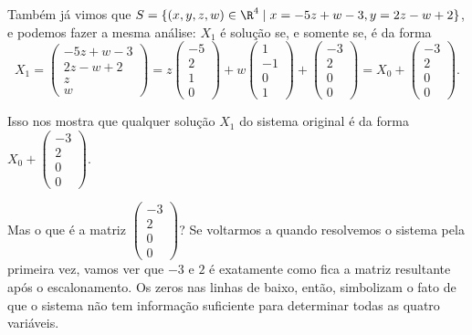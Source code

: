\begin{ex}
	Também já vimos que $S=\{(x,y,z,w)\in \R^4\mid x=-5z+w-3,y=2z-w+2\}$, e podemos fazer a mesma análise: $X_1$ é solução se, e somente se, é da forma
	\[X_1=\begin{pmatrix}
	-5z+w-3\\2z-w+2\\z\\w
	\end{pmatrix}=z\begin{pmatrix}
	-5\\2\\1\\0
	\end{pmatrix}+w\begin{pmatrix}
	1\\-1\\0\\1
	\end{pmatrix}+\begin{pmatrix}
	-3\\2\\0\\0
	\end{pmatrix}=X_0+\begin{pmatrix}
	-3\\2\\0\\0
	\end{pmatrix}.\]
	
	Isso nos mostra que qualquer solução $X_1$ do sistema original é da forma $X_0+\begin{pmatrix}
	-3\\2\\0\\0
	\end{pmatrix}$.
	
	Mas o que é a matriz $\begin{pmatrix}
	-3\\2\\0\\0
	\end{pmatrix}$? Se voltarmos a quando resolvemos o sistema pela primeira vez, vamos ver que $-3$ e $2$ é exatamente como fica a matriz resultante após o escalonamento. Os zeros nas linhas de baixo, então, simbolizam o fato de que o sistema não tem informação suficiente para determinar todas as quatro variáveis.
	

\end{ex}
